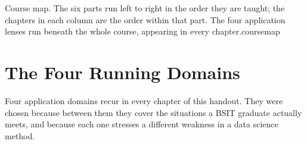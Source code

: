 {{}}%
{Course map. The six parts run left to right in the order they are taught; the chapters
in each column are the order within that part. The four application lenses run beneath
the whole course, appearing in every chapter.}{coursemap}

\section*{The Four Running Domains}

Four application domains recur in every chapter of this handout. They were
chosen because between them they cover the situations a BSIT graduate actually
meets, and because each one stresses a different weakness in a data science
method.

